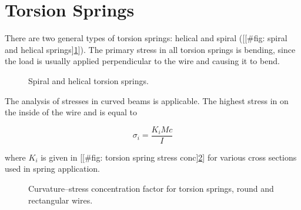 \documentclass[a4paper,openany,12pt]{book}
\begin{document}
{{\section{Torsion Springs}
\label{torsion-springs}
There are two general types of torsion springs: helical and spiral
([[\#fig: spiral and helical springs]\ref{fig: spiral and helical springs}]).
The primary stress in all torsion springs is bending, since the load is
usually applied perpendicular to the wire and causing it to bend.

\begin{figure}[h]
  \centering
  \caption{Spiral and helical torsion springs.}
  \label{fig: spiral and helical springs}
\end{figure}

The analysis of stresses in curved beams is applicable. The highest
stress in on the inside of the wire and is equal to

$$\sigma_i = \frac{K_iMc}{I}$$

where \(K_i\) is given in [[\#fig: torsion spring stress conc]\ref{fig: torsion spring stress conc}] for various cross sections used in spring application.

\begin{figure}[h]
  \centering
  \caption{Curvature--stress concentration factor for torsion springs, round and rectangular wires.}
  \label{fig: torsion spring stress conc}
\end{figure}

}}
\end{document}
